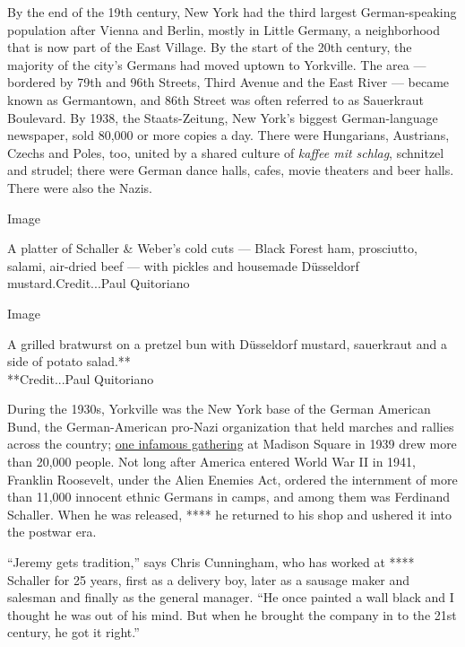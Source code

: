 By the end of the 19th century, New York had the third largest
German-speaking population after Vienna and Berlin, mostly in Little
Germany, a neighborhood that is now part of the East Village. By the
start of the 20th century, the majority of the city's Germans had moved
uptown to Yorkville. The area --- bordered by 79th and 96th Streets,
Third Avenue and the East River --- became known as Germantown, and 86th
Street was often referred to as Sauerkraut Boulevard. By 1938, the
Staats-Zeitung, New York's biggest German-language newspaper, sold
80,000 or more copies a day. There were Hungarians, Austrians, Czechs
and Poles, too, united by a shared culture of \emph{kaffee mit schlag},
schnitzel and strudel; there were German dance halls, cafes, movie
theaters and beer halls. There were also the Nazis.

Image

A platter of Schaller \& Weber's cold cuts --- Black Forest ham,
prosciutto, salami, air-dried beef --- with pickles and housemade
Düsseldorf mustard.Credit...Paul Quitoriano

Image

A grilled bratwurst on a pretzel bun with Düsseldorf mustard, sauerkraut
and a side of potato salad.**\\
**Credit...Paul Quitoriano

During the 1930s, Yorkville was the New York base of the German American
Bund, the German-American pro-Nazi organization that held marches and
rallies across the country;
\href{https://www.nytimes3xbfgragh.onion/1939/02/21/archives/22000-nazis-hold-rally-in-garden-police-check-foes-scenes-as.html}{one
infamous gathering} at Madison Square in 1939 drew more than 20,000
people. Not long after America entered World War II in 1941, Franklin
Roosevelt, under the Alien Enemies Act, ordered the internment of more
than 11,000 innocent ethnic Germans in camps, and among them was
Ferdinand Schaller. When he was released, **** he returned to his shop
and ushered it into the postwar era.

``Jeremy gets tradition,'' says Chris Cunningham, who has worked at ****
Schaller for 25 years, first as a delivery boy, later as a sausage maker
and salesman and finally as the general manager. ``He once painted a
wall black and I thought he was out of his mind. But when he brought the
company in to the 21st century, he got it right.''

